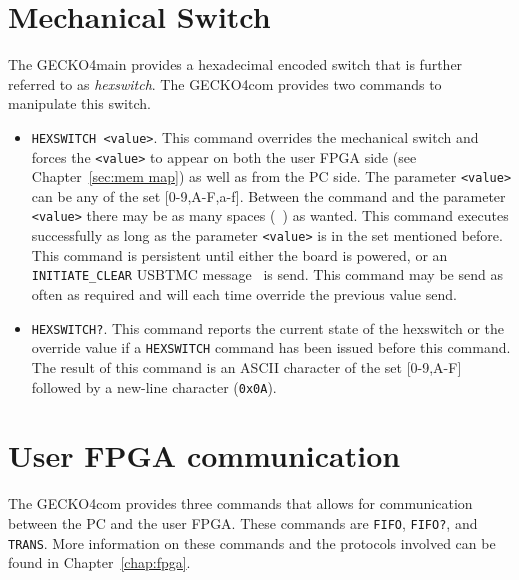 \section{Mechanical Switch}
\label{sec: hexswitch}
The {\sc GECKO4main} provides a hexadecimal encoded switch that is further
referred to as \emph{hexswitch}. The {\sc GECKO4com} provides two commands to
manipulate this switch.
\begin{itemize}
\item \verb*+HEXSWITCH <value>+. This command overrides the mechanical switch and
forces the \verb+<value>+ to appear on both the user FPGA side (see
Chapter~\ref{sec:mem map}) as well as from the PC side. The parameter
\verb+<value>+ can be any of the set [0-9,A-F,a-f]. Between the command and the
parameter \verb+<value>+ there may be as many spaces (\verb*+ +) as wanted. This
command executes successfully as long as the parameter \verb+<value>+ is in the
set mentioned before. This command is persistent until either the board is
powered, or an \verb+INITIATE_CLEAR+ USBTMC message~\cite{usbtmc} is send. This
command may be send as often as required and will each time override the
previous value send.
\item \verb+HEXSWITCH?+. This command reports the current state of the hexswitch
or the override value if a \verb+HEXSWITCH+ command has been issued before this
command. The result of this command is an ASCII character of the set [0-9,A-F]
followed by a new-line character (\verb+0x0A+).
\end{itemize}
\section{User FPGA communication}
The {\sc GECKO4com} provides three commands that allows for communication
between the PC and the user FPGA. These commands are \verb+FIFO+, \verb+FIFO?+,
and \verb+TRANS+. More information on these commands and the protocols involved
can be found in Chapter~\ref{chap:fpga}.

